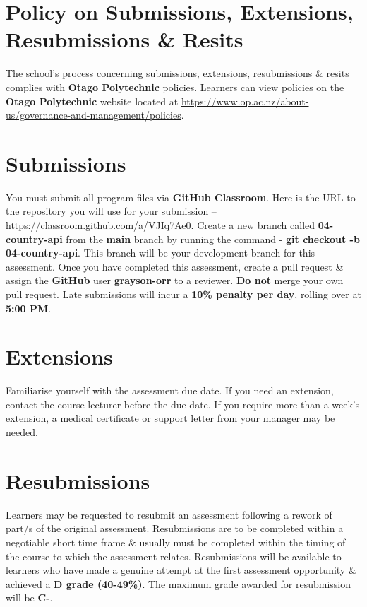 \documentclass{article}
\begin{document}
\section*{Policy on Submissions, Extensions, Resubmissions \& Resits}
The school's process concerning submissions, extensions, resubmissions \& resits complies with \textbf{Otago Polytechnic} policies. Learners can view policies on the \textbf{Otago Polytechnic} website located at \href{https://www.op.ac.nz/about-us/governance-and-management/policies}{https://www.op.ac.nz/about-us/governance-and-management/policies}.

\section*{Submissions}
You must submit all program files via \textbf{GitHub Classroom}. Here is the URL to the repository you will use for your submission – \href{https://classroom.github.com/a/VJIq7Ae0}{https://classroom.github.com/a/VJIq7Ae0}. Create a new branch called  \textbf{04-country-api} from the \textbf{main} branch by running the command - \textbf{git checkout -b 04-country-api}. This branch will be your development branch for this assessment. Once you have completed this assessment, create a pull request \& assign the \textbf{GitHub} user \textbf{grayson-orr} to a reviewer. \textbf{Do not} merge your own pull request. Late submissions will incur a \textbf{10\% penalty per day}, rolling over at \textbf{5:00 PM}.

\section*{Extensions}
Familiarise yourself with the assessment due date. If you need an extension, contact the course lecturer before the due date. If you require more than a week's extension, a medical certificate or support letter from your manager may be needed.

\section*{Resubmissions}
Learners may be requested to resubmit an assessment following a rework of part/s of the original assessment. Resubmissions are to be completed within a negotiable short time frame \& usually must be completed within the timing of the course to which the assessment relates. Resubmissions will be available to learners who have made a genuine attempt at the first assessment opportunity \& achieved a \textbf{D grade (40-49\%)}. The maximum grade awarded for resubmission will be \textbf{C-}.
\end{document}
